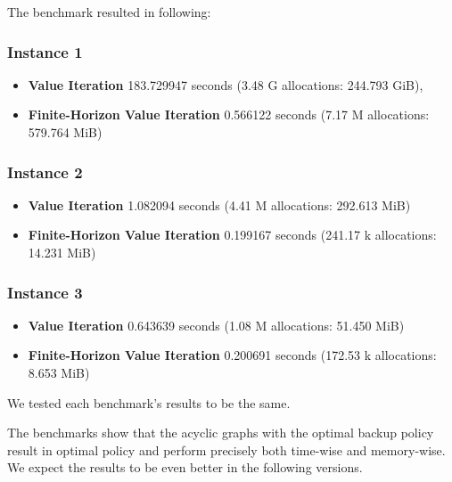 The benchmark resulted in following:

\subsubsection{Instance 1}

\begin{itemize}
    \item \textbf{Value Iteration} 183.729947 seconds (3.48 G allocations: 244.793 GiB),
    \item \textbf{Finite-Horizon Value Iteration}   0.566122 seconds (7.17 M allocations: 579.764 MiB)
\end{itemize}

\subsubsection{Instance 2}

\begin{itemize}
    \item \textbf{Value Iteration} 1.082094 seconds (4.41 M allocations: 292.613 MiB)
    \item \textbf{Finite-Horizon Value Iteration}   0.199167 seconds (241.17 k allocations: 14.231 MiB)
\end{itemize}

\subsubsection{Instance 3}

\begin{itemize}
    \item \textbf{Value Iteration} 0.643639 seconds (1.08 M allocations: 51.450 MiB)
    \item \textbf{Finite-Horizon Value Iteration}   0.200691 seconds (172.53 k allocations: 8.653 MiB)
\end{itemize}  

We tested each benchmark's results to be the same.

The benchmarks show that the acyclic graphs with the optimal backup policy result in optimal policy and perform precisely both time-wise and memory-wise. We expect the results to be even better in the following versions.